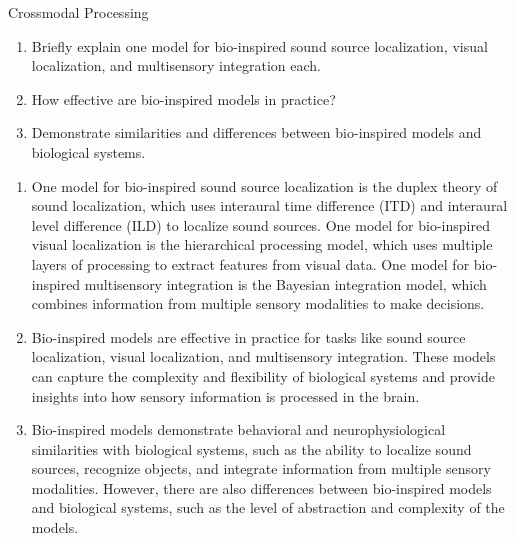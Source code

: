 \documentclass{article}
\begin{document}
\begin{exercise}{Crossmodal Processing}
  \begin{enumerate}
    \item Briefly explain one model for bio-inspired sound source localization, visual localization, and multisensory integration each.
    \item How effective are bio-inspired models in practice?
    \item Demonstrate similarities and differences between bio-inspired models and biological systems.
  \end{enumerate}

  \begin{solution}
    \begin{enumerate}
      \item One model for bio-inspired sound source localization is the duplex theory of sound localization, which uses interaural time difference (ITD) and interaural level difference (ILD) to localize sound sources. One model for bio-inspired visual localization is the hierarchical processing model, which uses multiple layers of processing to extract features from visual data. One model for bio-inspired multisensory integration is the Bayesian integration model, which combines information from multiple sensory modalities to make decisions.
      \item Bio-inspired models are effective in practice for tasks like sound source localization, visual localization, and multisensory integration. These models can capture the complexity and flexibility of biological systems and provide insights into how sensory information is processed in the brain.
      \item Bio-inspired models demonstrate behavioral and neurophysiological similarities with biological systems, such as the ability to localize sound sources, recognize objects, and integrate information from multiple sensory modalities. However, there are also differences between bio-inspired models and biological systems, such as the level of abstraction and complexity of the models.
    \end{enumerate}
  \end{solution}
\end{exercise}
\end{document}
